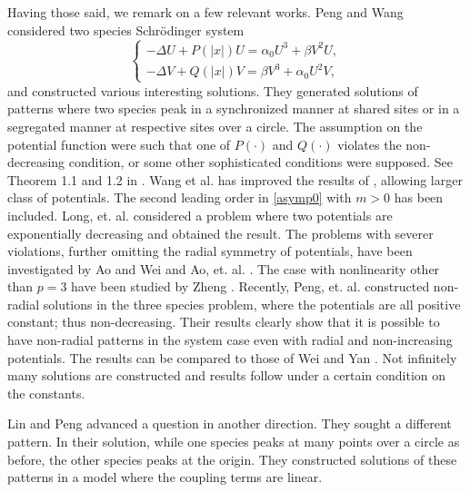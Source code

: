 \documentclass{amsart}
\theoremstyle{definition}
\theoremstyle{remark}
\numberwithin{equation}{section}
\begin{document}
Having those said, we remark on a few relevant works. Peng and Wang \cite{peng_wang_2013} considered two species Schr\"odinger system 
\begin{equation*}\begin{cases}
 -\Delta U+ P(|x|)U = \alpha_0 U^3 + \beta V^2 U,\\
 -\Delta V+ Q(|x|)V = \beta V^3 + \alpha_0 U^2 V,
\end{cases}\end{equation*}
and constructed various interesting solutions. They generated solutions of patterns where two species peak in a synchronized manner at shared sites or in a segregated manner at respective sites over a circle. The assumption on the potential function were such that one of $P(\cdot)$ and $Q(\cdot)$ violates the non-decreasing condition, or some other sophisticated conditions were supposed. See Theorem 1.1 and 1.2 in \cite{peng_wang_2013}. Wang et al. \cite{wang_zhao_2017} has improved the results of \cite{peng_wang_2013}, allowing larger class of potentials. The second leading order in \eqref{asymp0} with $m>0$ has been included. Long, et. al. \cite{long_tang_yang_2020} considered a problem where two potentials are  exponentially decreasing and obtained the result. The problems with severer violations, further omitting the radial symmetry of potentials, have been investigated by Ao and Wei \cite{ao_wei_2014} and Ao, et. al. \cite{ao_wang_yao_2016}. The case with nonlinearity other than $p=3$ have been studied by Zheng \cite{zheng_2017}. Recently, Peng, et. al. \cite{peng_wang_wang_2019} constructed non-radial solutions in the three species problem, where the potentials are all positive constant; thus non-decreasing. Their results clearly show that it is possible to have non-radial patterns in the system case even with radial and non-increasing potentials. %
The results can be compared to those of Wei and Yan \cite{wei_yan_2014}. Not infinitely many solutions are constructed and results follow under a certain condition on the constants.


Lin and Peng \cite{lin_peng_2014} advanced a question in another direction. They sought a different pattern. In their solution, while one species peaks at many points over a circle as before, the other species peaks at the origin. They constructed solutions of these patterns in a model where the coupling terms are linear.
\end{document}

